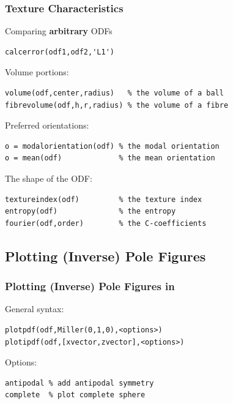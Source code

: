 \begin{frame}[fragile]
  \frametitle{Texture Characteristics}

Comparing {\bf arbitrary} ODFs
\begin{lstlisting}
calcerror(odf1,odf2,'L1')
\end{lstlisting}

\pause

Volume portions:
\begin{lstlisting}
volume(odf,center,radius)   % the volume of a ball
fibrevolume(odf,h,r,radius) % the volume of a fibre
\end{lstlisting}

\pause

Preferred orientations:
\begin{lstlisting}
o = modalorientation(odf) % the modal orientation
o = mean(odf)             % the mean orientation
\end{lstlisting}

\pause

The shape of the ODF:
\begin{lstlisting}
textureindex(odf)         % the texture index
entropy(odf)              % the entropy
fourier(odf,order)        % the C-coefficients
\end{lstlisting}


\end{frame}


\subsection*{Plotting (Inverse) Pole Figures}

\begin{frame}[fragile]
  \frametitle{Plotting (Inverse) Pole Figures in \MTEX}

  General syntax:
\begin{lstlisting}
plotpdf(odf,Miller(0,1,0),<options>)
plotipdf(odf,[xvector,zvector],<options>)
\end{lstlisting}

Options:
\begin{lstlisting}
antipodal % add antipodal symmetry
complete  % plot complete sphere
\end{lstlisting}



\end{frame}


